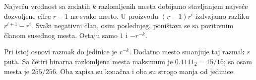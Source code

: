 
Najveću vrednost sa zadatih $k$ razlomljenih mesta dobijamo stavljanjem najveće dozvoljene cifre $r-1$ na svako mesto. U proizvodu $(r-1)r^i$ izdvajamo razliku $r^{i+1}-r^i$. Svaki negativni član, osim poslednjeg, poništava se sa pozitivnim članom susednog mesta. Ostaju samo $1$ i $-r^{-k}$.

Pri istoj osnovi razmak do jedinice je $r^{-k}$. Dodatno mesto smanjuje taj razmak $r$ puta. Sa četiri binarna razlomljena mesta maksimum je $0.1111_2=15/16$; sa osam mesta je $255/256$. Oba zapisa su konačna i oba su strogo manja od jedinice.

